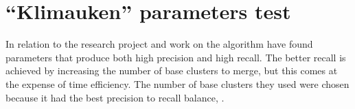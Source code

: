


\section{``Klimauken'' parameters test}
In relation to the  research project and work on the \CTC algorithm \cite[][]{Moe2014compact} have found parameters that produce both high precision and high recall. The better recall is achieved by increasing the number of base clusters to merge, but this comes at the expense of time efficiency. The number of base clusters they used were chosen because it had the best precision to recall balance, \parencite{Moe2014compact}.

